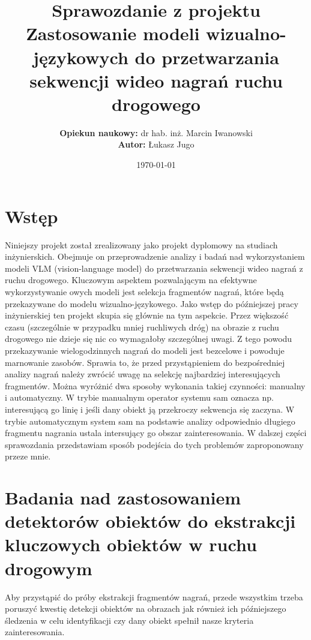 \documentclass[a4paper]{article}
\title{\textbf{Sprawozdanie z projektu}\\Zastosowanie modeli wizualno-językowych do przetwarzania sekwencji wideo nagrań ruchu drogowego}
\author{\textbf{Opiekun naukowy:} dr hab. inż. Marcin Iwanowski\\
       \textbf{ Autor:} Łukasz Jugo}
\date{\today}
\begin{document}
\maketitle
\newpage
\tableofcontents
\newpage

\section{Wstęp}
Niniejszy projekt został zrealizowany jako projekt dyplomowy na studiach inżynierskich. Obejmuje on przeprowadzenie analizy i badań nad wykorzystaniem modeli VLM (vision-language model) do przetwarzania sekwencji wideo nagrań z ruchu drogowego. Kluczowym aspektem pozwalającym na efektywne wykorzystywanie owych modeli jest selekcja fragmentów nagrań, które będą przekazywane do modelu wizualno-językowego. Jako wstęp do późniejszej pracy inżynierskiej ten projekt skupia się głównie na tym aspekcie. Przez większość czasu (szczególnie w przypadku mniej ruchliwych dróg) na obrazie z ruchu drogowego nie dzieje się nic co wymagałoby szczególnej uwagi. Z tego powodu przekazywanie wielogodzinnych nagrań do modeli jest bezcelowe i powoduje marnowanie zasobów. Sprawia to, że przed przystąpieniem do bezpośredniej analizy nagrań należy zwrócić uwagę na selekcję najbardziej interesujących fragmentów. Można wyróżnić dwa sposoby wykonania takiej czynności: manualny i automatyczny. W trybie manualnym operator systemu sam oznacza np. interesującą go linię i jeśli dany obiekt ją przekroczy sekwencja się zaczyna. W trybie automatycznym system sam na podstawie analizy odpowiednio długiego fragmentu nagrania ustala intersujący go obszar zainteresowania. W dalszej części sprawozdania przedstawiam sposób podejścia do tych problemów zaproponowany przeze mnie.
\section{Badania nad zastosowaniem detektorów obiektów do ekstrakcji kluczowych obiektów w ruchu drogowym}
Aby przystąpić do próby ekstrakcji fragmentów nagrań, przede wszystkim trzeba poruszyć kwestię detekcji obiektów na obrazach jak również ich późniejszego śledzenia w celu identyfikacji czy dany obiekt spełnił nasze kryteria zainteresowania.
\end{document}
